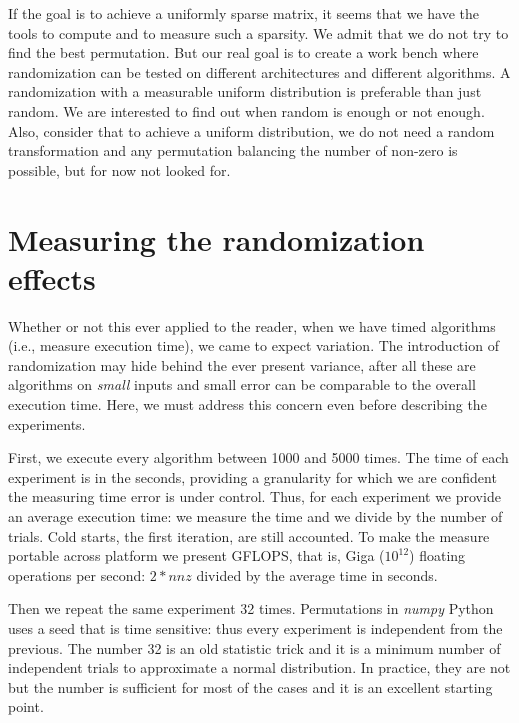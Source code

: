 \documentclass[manuscript,screen]{acmart}
\begin{document}

If the goal is to achieve a uniformly sparse matrix, it seems that we
have the tools to compute and to measure such a sparsity. We admit
that we do not try to find the best permutation. But our real goal is
to create a work bench where randomization can be tested on different
architectures and different algorithms. A randomization with a
measurable uniform distribution is preferable than just random. We are
interested to find out when random is enough or not enough. Also,
consider that to achieve a uniform distribution, we do not need a
random transformation and any permutation balancing the number of
non-zero is possible, but for now not looked for.

\section{Measuring the randomization effects}
\label{sec:measuring}

Whether or not this ever applied to the reader, when we have timed
algorithms (i.e., measure execution time), we came to expect
variation.  The introduction of randomization may hide behind the ever
present variance, after all these are algorithms on {\em small} inputs
and small error can be comparable to the overall execution time. Here,
we must address this concern even before describing the experiments.

First, we execute every algorithm between 1000 and 5000 times. The
time of each experiment is in the seconds, providing a granularity for
which we are confident the measuring time error is under
control. Thus, for each experiment we provide an average execution
time: we measure the time and we divide by the number of trials. Cold
starts, the first iteration, are still accounted. To make the measure
portable across platform we present GFLOPS, that is, Giga ($10^{12}$)
floating operations per second: $2*nnz$ divided by the average time in
seconds. 

Then we repeat the same experiment 32 times. Permutations in {\em
  numpy} Python uses a seed that is time sensitive: thus every
experiment is independent from the previous. The number 32 is an old
statistic trick and it is a minimum number of independent trials to
approximate a normal distribution. In practice, they are not but the
number is sufficient for most of the cases and it is an excellent
starting point.
\end{document}
